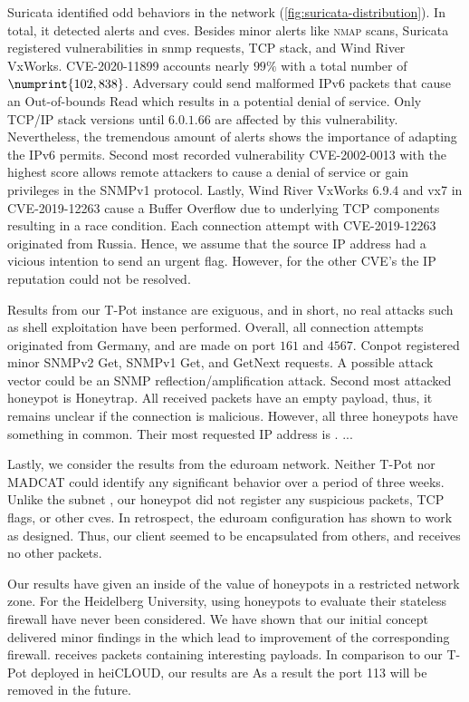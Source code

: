 Suricata identified odd behaviors in the network (\autoref{fig:suricata-distribution}).
In total, it detected  alerts and \acsp{cve}.
Besides minor alerts like \textsc{nmap} scans, Suricata registered vulnerabilities in \ac{snmp} requests, TCP stack, and Wind River VxWorks.
CVE-2020-11899 \cite{CVE-2020-11899} accounts nearly $99\%$ with a total number of $\numprint{102,838}$.
Adversary could send malformed IPv6 packets that cause an Out-of-bounds Read which results in a potential denial of service.
Only TCP/IP stack versions until $6.0.1.66$ are affected by this vulnerability.
Nevertheless, the tremendous amount of alerts shows the importance of adapting the IPv6 permits.
Second most recorded vulnerability CVE-2002-0013 \cite{CVE-2002-0013} with the highest score allows remote attackers to cause a denial of service or gain privileges in the SNMPv1 protocol. 
Lastly, Wind River VxWorks 6.9.4 and vx7 in CVE-2019-12263 \cite{CVE-2019-12263} cause a Buffer Overflow due to underlying TCP components resulting in a race condition.
Each connection attempt with CVE-2019-12263 originated from Russia.
Hence, we assume that the source IP address had a vicious intention to send an urgent flag.
However, for the other CVE's the IP reputation could not be resolved.

Results from our T-Pot instance are exiguous, and in short, no real attacks such as shell exploitation have been performed.
Overall, all connection attempts originated from Germany, and are made on port $161$ and $4567$. 
Conpot registered minor SNMPv2 Get, SNMPv1 Get, and GetNext requests.
A possible attack vector could be an SNMP reflection/amplification attack.
Second most attacked honeypot is Honeytrap.
All received packets have an empty payload, thus, it remains unclear if the connection is malicious.
However, all three honeypots have something in common.
Their most requested IP address is .
...

Lastly, we consider the results from the eduroam network.
Neither T-Pot nor MADCAT could identify any significant behavior over a period of three weeks.
Unlike the subnet , our honeypot did not register any suspicious packets, TCP flags, or other \acp{cve}.
In retrospect, the eduroam configuration has shown to work as designed.
Thus, our client seemed to be encapsulated from others, and receives no other packets.

Our results have given an inside of the value of honeypots in a restricted network zone.
For the Heidelberg University, using honeypots to evaluate their stateless firewall have never been considered.
We have shown that our initial concept delivered minor findings in the \ipAddress{} which lead to improvement of the corresponding firewall.
receives packets containing interesting payloads.
In comparison to our T-Pot deployed in heiCLOUD, our results are
As a result the port 113 will be removed in the future.

